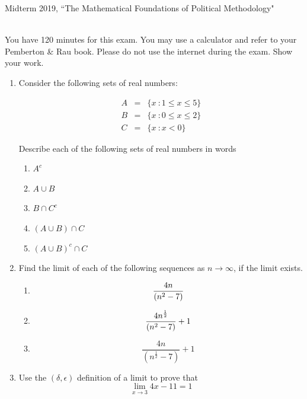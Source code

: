 \documentclass[11pt]{article}
\begin{document}
\noindent \large Midterm 2019, ``The Mathematical Foundations of Political Methodology"

\normalsize
\ \\You have 120 minutes for this exam.  You may use a calculator and refer to your Pemberton \& Rau book.  Please do not use the internet during the exam.  Show your work.

\begin{enumerate}

\item Consider the following sets of real numbers:

\begin{eqnarray}
A&=& \{x\ : 1\leq x\leq 5\} \nonumber\\
B&=& \{x\ : 0\leq x\leq 2\}\nonumber\\
C&=& \{x\ : x<0\}\nonumber
\end{eqnarray}

Describe each of the following sets of real numbers in words
\begin{enumerate}
\item $A^c$

\item $A\cup B$

\item $B\cap C^c$
\item $(A\cup B)\cap C$
\item $(A\cup B)^c\cap C$

\end{enumerate}

\vspace{.2in}

\item Find the limit of each of the following sequences as $n\rightarrow \infty$, if the limit exists.
\begin{enumerate}
\item $${{4n}\over{(n^2-7)}}$$
\item $${{4n^{\frac{1}{2}}}\over{(n^2-7)}}+1$$
\item  $$\frac{4n}{(n^{\frac{1}{2}}-7)}+1$$
\end{enumerate}

\vspace{.2in}
\item Use the $(\delta, \epsilon)$ definition of a limit to prove that 
$$\lim_{x\rightarrow 3} 4x-11=1$$
%


\end{enumerate}
\end{document}
